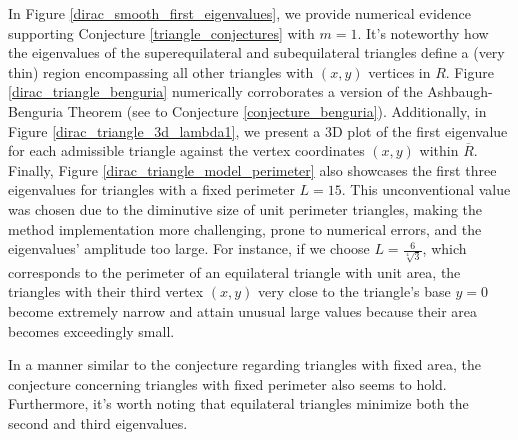 In Figure \ref{dirac_smooth_first_eigenvalues}, we provide numerical evidence supporting Conjecture \ref{triangle_conjectures} with \(m=1\). It's noteworthy how the eigenvalues of the superequilateral and subequilateral triangles define a (very thin) region encompassing all other triangles with \((x, y)\) vertices in \(R\). Figure \ref{dirac_triangle_benguria} numerically corroborates a version of the Ashbaugh-Benguria Theorem
(see to Conjecture \ref{conjecture_benguria}). Additionally, in Figure \ref{dirac_triangle_3d_lambda1}, we present a 3D plot of the first eigenvalue for each admissible triangle against the vertex coordinates \((x,y)\) within \(\overline{R}\). Finally, Figure \ref{dirac_triangle_model_perimeter} also showcases the first three eigenvalues for triangles with a fixed perimeter \(L = 15\). This unconventional value was chosen due to the diminutive size of unit perimeter triangles, making the method implementation more challenging, prone to numerical errors, and the eigenvalues' amplitude too large. For instance, if we choose \(L = \frac{6}{\sqrt[4]{3}}\), which corresponds to the perimeter of an equilateral triangle with unit area, the triangles with their third vertex \((x,y)\) very close to the triangle's base \(y=0\) become extremely narrow and attain unusual large values because their area becomes exceedingly small.

In a manner similar to the conjecture regarding triangles with fixed area, the conjecture concerning triangles with fixed perimeter also seems to hold. Furthermore, it's worth noting that equilateral triangles minimize both the second and third eigenvalues.

